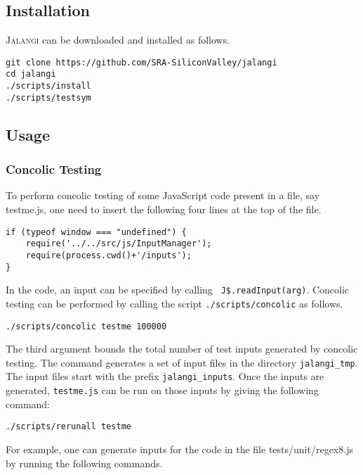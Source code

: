 \documentclass{sig-alternate}
\def\jalangi{\textsc{Jalangi}}
\begin{document}
\subsection{Installation}
\label{sec:installation}

\jalangi{} can be downloaded and installed as follows.

\begin{verbatim}
git clone https://github.com/SRA-SiliconValley/jalangi
cd jalangi
./scripts/install
./scripts/testsym
\end{verbatim}

\subsection{Usage}
\label{sec:usage-1}

\subsubsection*{Concolic Testing}
\label{sec:concolic-testing}

To perform concolic testing of some JavaScript code present in a file,
say testme.js, one need to insert the following four lines at the top
of the file.

\begin{verbatim}
if (typeof window === "undefined") {
    require('../../src/js/InputManager');
    require(process.cwd()+'/inputs');
}
\end{verbatim}

In the code, an input can be specified by calling \texttt{
  J\$.readInput(arg)}. Concolic testing can be performed by calling
the script \texttt{./scripts/concolic} as follows.

\begin{verbatim}
./scripts/concolic testme 100000
\end{verbatim}

The third argument bounds the total number of test inputs generated by
concolic testing. The command generates a set of input files in the
directory \texttt{jalangi\_tmp}. The input files start with the prefix
\texttt{jalangi\_inputs}.  Once the inputs are generated,
\texttt{testme.js} can be run on those inputs by giving the following
command:

\begin{verbatim}
./scripts/rerunall testme
\end{verbatim}

For example, one can generate inputs for the code in the file
tests/unit/regex8.js by running the following commands.
\end{document}
